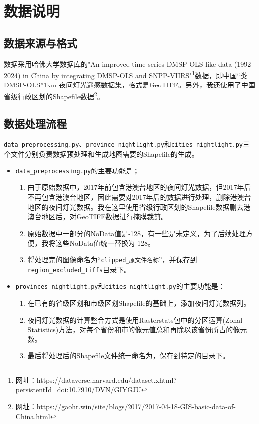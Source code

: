 \documentclass[14pt,a4paper,UTF8,twoside]{article}
\begin{document}
\section{数据说明}
\subsection{数据来源与格式}
数据采用哈佛大学数据库的"An improved time-series DMSP-OLS-like data (1992-2024) in China by integrating DMSP-OLS and SNPP-VIIRS"\footnote{网址：https://dataverse.harvard.edu/dataset.xhtml?persistentId=doi:10.7910/DVN/GIYGJU}数据，即中国“类DMSP-OLS”1km 夜间灯光遥感数据集，格式是GeoTIFF。另外，我还使用了中国省级行政区划的Shapefile数据\footnote{网址：https://gaohr.win/site/blogs/2017/2017-04-18-GIS-basic-data-of-China.html}。
\subsection{数据处理流程}
\texttt{data\_preprocessing.py}、\texttt{province\_nightlight.py}和\texttt{cities\_nightlight.py}三个文件分别负责数据预处理和生成地图需要的Shapefile的生成。

\begin{itemize}
    \item \texttt{data\_preprocessing.py}的主要功能是；

\begin{enumerate}
    \item 由于原始数据中，2017年前包含港澳台地区的夜间灯光数据，但2017年后不再包含港澳台地区，因此需要对2017年后的数据进行处理，删除港澳台地区的夜间灯光数据。我在这里使用省级行政区划的Shapefile数据删去港澳台地区后，对GeoTIFF数据进行掩膜裁剪。
    \item 原始数据中一部分的NoData值是-128，有一些是未定义，为了后续处理方便，我将这些NoData值统一替换为-128。
    \item 将处理完的图像命名为“\texttt{clipped\_原文件名称}”，并保存到\texttt{region\_excluded\_tiffs}目录下。
\end{enumerate}
    \item \texttt{provinces\_nightlight.py}和\texttt{cities\_nightlight.py}的主要功能是：

    \begin{enumerate}
        \item 在已有的省级区划和市级区划Shapefile的基础上，添加夜间灯光数据列。
        \item 夜间灯光数据的计算整合方式是使用Rasterstats包中的分区运算(Zonal Statistics)方法，对每个省份和市的像元值总和再除以该省份所占的像元数。
        \item 最后将处理后的Shapefile文件统一命名为，保存到特定的目录下。
    \end{enumerate}
\end{itemize}
\end{document}
